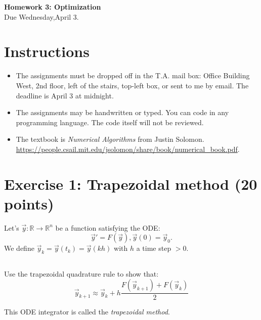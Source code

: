 


\begin{center}
{\large\textbf{Homework 3: Optimization}}\\
Due Wednesday,April 3.
\end{center}

\noindent\makebox[\linewidth]{\rule{\linewidth}{0.6pt}}
 
\section*{Instructions}

\begin{itemize}
\item The assignments must be dropped off in the T.A. mail box: Office Building West, 2nd floor, left of the stairs, top-left box, or sent to me by email. The deadline is April 3 at midnight.
\item The assignments may be handwritten or typed. You can code in any programming language. The code itself will not be reviewed. 
\item The textbook is \emph{Numerical Algorithms} from Justin Solomon.\\ \url{https://people.csail.mit.edu/jsolomon/share/book/numerical_book.pdf}.  
\end{itemize}



\noindent\makebox[\linewidth]{\rule{\linewidth}{0.6pt}}

\section*{Exercise 1: Trapezoidal method \normalsize \textnormal(20 points)}

Let's $\vec{y}: \mathds{R} \rightarrow \mathds{R}^n$ be a function satisfying the ODE:
$$\vec{y}'= F(\vec{y}), \vec{y}(0) = \vec{y}_0.$$
We define $\vec{y}_k = \vec{y}(t_k) = \vec{y}(kh)$ with $h$ a time step $> 0$.

\subsection{} Use the trapezoidal quadrature rule to show that:
$$\vec{y}_{k+1} \approx \vec{y}_k + h\frac{F(\vec{y}_{k+1}) + F(\vec{y}_k)}{2}$$

This ODE integrator is called the \emph{trapezoidal method}.

